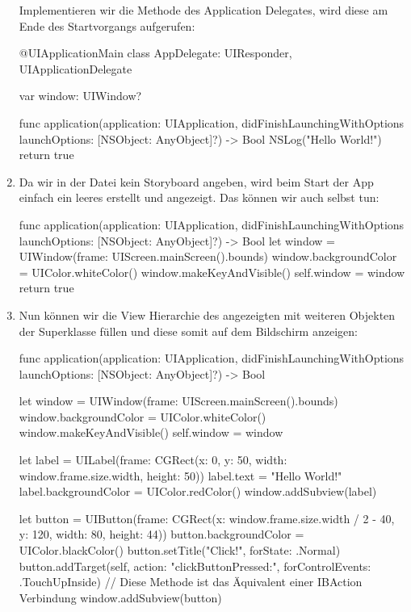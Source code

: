 \documentclass[parskip=half, final]{scrreprt}
\begin{document}
\begin{lecture}
\begin{enumerate}
Implementieren wir die  Methode des Application Delegates, wird diese am Ende des Startvorgangs aufgerufen:

\begin{swiftcode}
@UIApplicationMain
class AppDelegate: UIResponder, UIApplicationDelegate {
    var window: UIWindow?

    func application(application: UIApplication, didFinishLaunchingWithOptions launchOptions: [NSObject: AnyObject]?) -> Bool {        
        NSLog("Hello World!")
        return true
    }
}	
\end{swiftcode}

\item Da wir in der  Datei kein Storyboard angeben, wird beim Start der App einfach ein leeres  erstellt und angezeigt. Das können wir auch selbst tun:

\begin{swiftcode}
func application(application: UIApplication, didFinishLaunchingWithOptions launchOptions: [NSObject: AnyObject]?) -> Bool {
    let window = UIWindow(frame: UIScreen.mainScreen().bounds)
    window.backgroundColor = UIColor.whiteColor()
    window.makeKeyAndVisible()
    self.window = window
    return true
}
\end{swiftcode}

\item Nun können wir die View Hierarchie des angezeigten  mit weiteren Objekten der Superklasse  füllen und diese somit auf dem Bildschirm anzeigen:
\begin{swiftcode}
func application(application: UIApplication, didFinishLaunchingWithOptions launchOptions: [NSObject: AnyObject]?) -> Bool {
    let window = UIWindow(frame: UIScreen.mainScreen().bounds)
    window.backgroundColor = UIColor.whiteColor()
    window.makeKeyAndVisible()
    self.window = window
    
    let label = UILabel(frame: CGRect(x: 0, y: 50, width: window.frame.size.width, height: 50))
    label.text = "Hello World!"
    label.backgroundColor = UIColor.redColor()
    window.addSubview(label)
    
    let button = UIButton(frame: CGRect(x: window.frame.size.width / 2 - 40, y: 120, width: 80, height: 44))
    button.backgroundColor = UIColor.blackColor()
    button.setTitle("Click!", forState: .Normal)
    button.addTarget(self, action: "clickButtonPressed:", forControlEvents: .TouchUpInside) // Diese Methode ist das Äquivalent einer IBAction Verbindung
    window.addSubview(button)
    
}
\end{swiftcode}
\end{enumerate}
\end{lecture}
\end{document}
